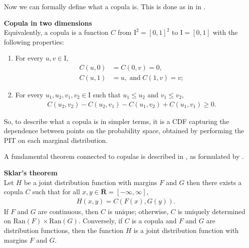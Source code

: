 Now we can formally define what a copula is. This is done as in  in .
\begin{definition}\label{def:copula}
            \textbf{Copula in two dimensions}\\
            Equivalently, a copula is a function $C$ from $\mathrm{I}^2=[0,1]^2$ to $\mathrm{I} = [0,1]$ with the following properties:
            \begin{enumerate}
                \item For every $u, v \in \mathrm{I}$,
                \begin{align*}
                    C(u,0) &= C(0,v) = 0,\\
                    C(u,1) &= u, \; \mathrm{and } \; C(1,v) = v;
                \end{align*}
                \item For every $u_1, u_2, v_1, v_2 \in \mathrm{I}$ such that $u_1 \leq u_2$ and $v_1 \leq v_2$,
                \begin{align*}
                    C(u_2,v_2) - C(u_2,v_1) - C(u_1,v_2) + C(u_1,v_1) \geq 0.
                \end{align*}
            \end{enumerate}
\end{definition}

So, to describe what a copula is in simpler terms, it is a \gls{CDF} capturing the dependence between points on the probability space, obtained by performing the \gls{PIT} on each marginal distribution. 

A fundamental theorem connected to copulas is described in , as formulated by . 
\begin{theorem}\label{the:Sklars}
        \textbf{Sklar's theorem} \\
        Let $H$ be a joint distribution function with margins $F$ and $G$ then there exists a copula $C$ such that for all $x,y \in \bar{\mathbf{R}} = \left[-\infty, \infty \right]$, 
        \begin{align}
            H(x,y) = C(F(x), G(y)). \label{eq:Sklar}
        \end{align}
        If $F$ and $G$ are continuous, then $C$ is unique; otherwise, $C$ is uniquely determined on $\mathrm{Ran}(F)\times\mathrm{Ran}(G)$. Conversely, if $C$ is a copula and $F$ and $G$ are distribution functions, then the function $H$ is a joint distribution function with margins $F$ and $G$.
\end{theorem}

